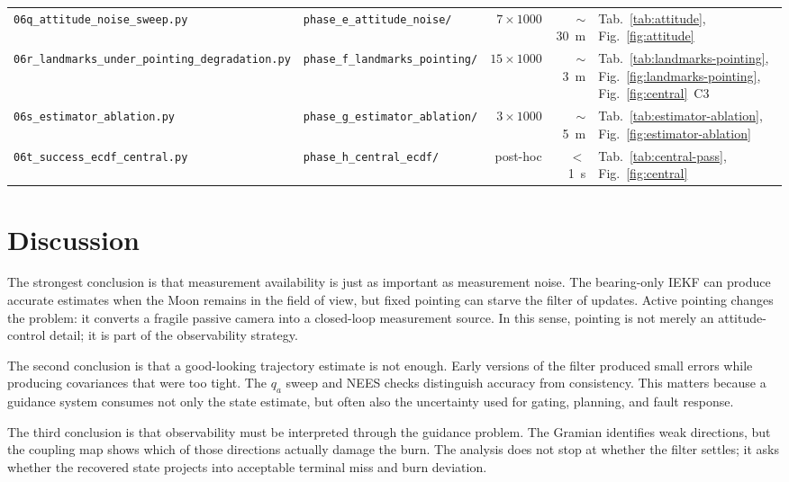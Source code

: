 \documentclass[10pt,twocolumn]{article}
\begin{document}
\begin{table}[t]
{\begin{tabular}{@{}llrrl@{}}
\texttt{06q\_attitude\_noise\_sweep.py}    & \texttt{phase\_e\_attitude\_noise/}         & $7\!\times\!1000$  & $\sim$30~m & Tab.~\ref{tab:attitude}, Fig.~\ref{fig:attitude} \\
\texttt{06r\_landmarks\_under\_pointing\_degradation.py} & \texttt{phase\_f\_landmarks\_pointing/} & $15\!\times\!1000$ & $\sim$3~m  & Tab.~\ref{tab:landmarks-pointing}, Fig.~\ref{fig:landmarks-pointing}, Fig.~\ref{fig:central}~C3 \\
\texttt{06s\_estimator\_ablation.py}       & \texttt{phase\_g\_estimator\_ablation/}     & $3\!\times\!1000$  & $\sim$5~m  & Tab.~\ref{tab:estimator-ablation}, Fig.~\ref{fig:estimator-ablation} \\
\texttt{06t\_success\_ecdf\_central.py}    & \texttt{phase\_h\_central\_ecdf/}           & post-hoc            & $<$1~s     & Tab.~\ref{tab:central-pass}, Fig.~\ref{fig:central} \\
\bottomrule
\end{tabular}}
\end{table}

\section{Discussion}
The strongest conclusion is that measurement availability is just as important as measurement noise.  The bearing-only IEKF can produce accurate estimates when the Moon remains in the field of view, but fixed pointing can starve the filter of updates.  Active pointing changes the problem: it converts a fragile passive camera into a closed-loop measurement source.  In this sense, pointing is not merely an attitude-control detail; it is part of the observability strategy.

The second conclusion is that a good-looking trajectory estimate is not enough.  Early versions of the filter produced small errors while producing covariances that were too tight.  The $q_a$ sweep and NEES checks distinguish accuracy from consistency.  This matters because a guidance system consumes not only the state estimate, but often also the uncertainty used for gating, planning, and fault response.

The third conclusion is that observability must be interpreted through the guidance problem.  The Gramian identifies weak directions, but the coupling map shows which of those directions actually damage the burn.  The analysis does not stop at whether the filter settles; it asks whether the recovered state projects into acceptable terminal miss and burn deviation.
\end{document}

